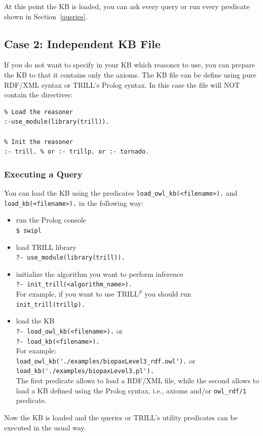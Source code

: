 \documentclass[a4paper,10pt]{scrartcl}
\begin{document}
At this point the KB is loaded, you can ask every query or run every predicate shown in Section~\ref{queries}.

\subsection{Case 2: Independent KB File}
If you do not want to specify in your KB which reasoner to use, you can prepare the KB to that it contains only the axioms. The KB file can be define using pure RDF/XML syntax or TRILL's Prolog syntax. In this case the file will NOT contain the directives:
\begin{verbatim}
% Load the reasoner
:-use_module(library(trill)).

% Init the reasoner
:- trill. % or :- trillp. or :- tornado.
\end{verbatim}

\subsubsection{Executing a Query}
\label{sec:trillq2}
You can load the KB using the predicates \verb|load_owl_kb(<filename>).| and \verb|load_kb(<filename>).| in the following way:
\begin{itemize}
	\item run the Prolog console\\
	\verb|$ swipl|
	\item load TRILL library\\
	\verb|?- use_module(library(trill)).|
	\item initialize the algorithm you want to perform inference\\
	\verb|?- init_trill(<algorithm_name>).|\\
	For example, if you want to use TRILL$^P$ you should run \verb|init_trill(trillp).|
	\item load the KB\\
	\verb|?- load_owl_kb(<filename>).| or\\
	\verb|?- load_kb(<filename>).|\\
	For example:\\
	\verb|load_owl_kb('./examples/biopaxLevel3_rdf.owl').| or\\
	\verb|load_kb('./examples/biopaxLevel3.pl').|\\
	The first predicate allows to load a RDF/XML file, while the second allows to load a KB defined using the Prolog syntax, i.e., axioms and/or \verb|owl_rdf/1| predicate.
\end{itemize}
\noindent
Now the KB is loaded and the queries or TRILL's utility predicates can be executed in the usual way.
\end{document}
